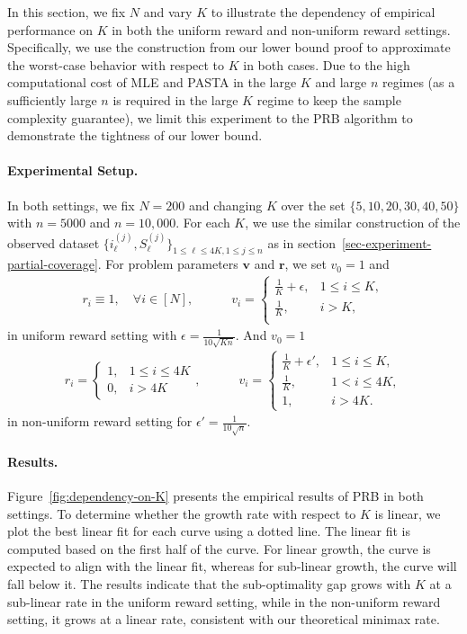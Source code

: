 \documentclass[10pt, letterpaper]{article}
\begin{document}
In this section, we fix $N$ and vary $K$ to illustrate the dependency of empirical performance on $K$ in both the uniform reward and non-uniform reward settings. Specifically, we use the construction from our lower bound proof to approximate the worst-case behavior with respect to $K$ in both cases. Due to the high computational cost of MLE and PASTA in the large $K$ and large $n$ regimes (as a sufficiently large $n$ is required in the large $K$ regime to keep the sample complexity guarantee), we limit this experiment to the PRB algorithm to demonstrate the tightness of our lower bound.


\paragraph{Experimental Setup.} In both settings, we fix $N = 200$ and changing $K$ over the set $\{5,10,20,30,40,50\}$ with $n = 5000$ and $n = 10,000$. For each $K$, we use the similar construction of the observed dataset $\{i_{\ell}^{(j)},S_{\ell}^{(j)}\}_{1\leq \ell \leq 4K, 1\leq j\leq n}$ as in section~\ref{sec-experiment-partial-coverage}. For problem parameters $\bm v$ and $\bm r$, we set $v_0 = 1$ and \begin{align*}
  r_i \equiv 1, \quad \forall i\in[N],  \qquad  \quad  v_i = \begin{cases}
        \frac{1}{K}+ \epsilon, & 1\leq i\leq K,\\
        \frac{1}{K}, & i>K,\\
    \end{cases}
\end{align*}
in uniform reward setting with $\epsilon=\frac{1}{10\sqrt{Kn}}$. And $v_0 = 1$
\begin{align*}
  r_i =\begin{cases}
      1, & 1\leq i\leq 4K\\
      0, & i>4K
  \end{cases}, \qquad  \quad  v_i = \begin{cases}
        \frac{1}{K}+ \epsilon', & 1\leq i\leq K,\\
        \frac{1}{K}, & 1<i\leq 4K,\\
        1, & i>4K.
    \end{cases}
\end{align*}
in non-uniform reward setting for $\epsilon' = \frac{1}{10\sqrt{n}}$. 

\paragraph{Results.} Figure~\ref{fig:dependency-on-K} presents the empirical results of PRB in both settings. To determine whether the growth rate with respect to $K$ is linear, we plot the best linear fit for each curve using a dotted line. The linear fit is computed based on the first half of the curve. For linear growth, the curve is expected to align with the linear fit, whereas for sub-linear growth, the curve will fall below it. The results indicate that the sub-optimality gap grows with $K$ at a sub-linear rate in the uniform reward setting, while in the non-uniform reward setting, it grows at a linear rate, consistent with our theoretical minimax rate.
\end{document}
